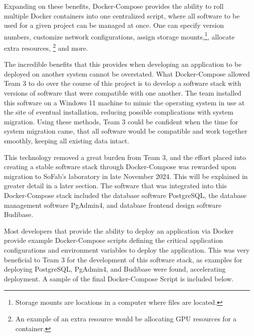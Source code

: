 \documentclass{article}
\begin{document}
Expanding on these benefits, Docker-Compose provides the ability to roll multiple Docker containers into one centralized script, 
where all software to be used for a given project can be managed at once. One can specify version numbers, customize network configurations,
assign storage mounts,\footnote{Storage mounts are locations in a computer where files are located.}, allocate extra resources,
\footnote{An example of an extra resource would be allocating GPU resources for a container.} and more. 

The incredible benefits that 
this provides when developing an application to be deployed on another system cannot be overstated. What Docker-Compose allowed Team 3 
to do over the course of this project is to develop a software stack with versions of software that were compatible with one another. The
team installed this software on a Windows 11 machine to mimic the operating system in use at the site of eventual installation, reducing 
possible complications with system migration. Using these methods, Team 3 could be confident when the time for system 
migration came, that all software would be compatible and work together smoothly, keeping all existing data intact. 

This technology removed a great burden from Team 3, and the effort placed into creating a stable software stack through Docker-Compose 
was rewarded upon migration to SoFab's laboratory in late November 2024. This will be explained in greater detail in a later section.
The software that was integrated into this Docker-Compose stack included the database software PostgreSQL, the database management 
software PgAdmin4, and database frontend design software Budibase. 

Most developers that provide the ability to deploy an application via Docker provide example Docker-Compose scripts defining the 
critical application configurations and environment variables to deploy the application. This was very beneficial to Team 3 for the 
development of this software stack, as examples for deploying PostgreSQL, PgAdmin4, and Budibase were found, accelerating deployment.
\cite{dockerhub-postgres} \cite{dockerhub-pgadmin} \cite{budibase-docker-compose}A sample of the final Docker-Compose Script is 
included below. 
\end{document}
